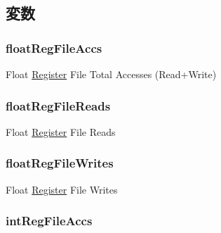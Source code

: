 \subsection{変数}
\hypertarget{classUseDefUnit_a71fd5719f07c55c81f0296e2835a7c90}{
\subsubsection[{floatRegFileAccs}]{ {\bf floatRegFileAccs}}}
\label{classUseDefUnit_a71fd5719f07c55c81f0296e2835a7c90}
Float \hyperlink{classRegister}{Register} File Total Accesses (Read+Write) \hypertarget{classUseDefUnit_a51481d49e9355c25c8afa3553771605d}{
\subsubsection[{floatRegFileReads}]{ {\bf floatRegFileReads}}}
\label{classUseDefUnit_a51481d49e9355c25c8afa3553771605d}
Float \hyperlink{classRegister}{Register} File Reads \hypertarget{classUseDefUnit_a5b7ee045b5715d8abb9d7e17502e6f09}{
\subsubsection[{floatRegFileWrites}]{ {\bf floatRegFileWrites}}}
\label{classUseDefUnit_a5b7ee045b5715d8abb9d7e17502e6f09}
Float \hyperlink{classRegister}{Register} File Writes \hypertarget{classUseDefUnit_abf73f69eb2ade79a3b55b431699c6d07}{
\subsubsection[{intRegFileAccs}]{ {\bf intRegFileAccs}}}
